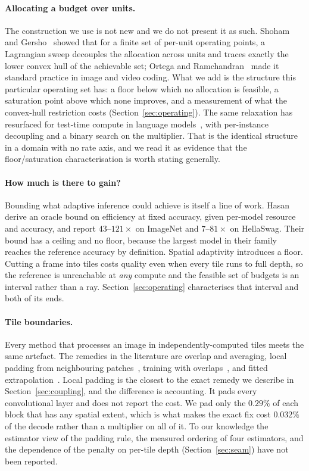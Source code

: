 \documentclass[10pt,twocolumn,letterpaper]{article}
\begin{document}
\paragraph{Allocating a budget over units.} The construction we use is not new
and we do not present it as such. Shoham and Gersho~\cite{shoham1988} showed
that for a finite set of per-unit operating points, a Lagrangian sweep decouples
the allocation across units and traces exactly the lower convex hull of the
achievable set; Ortega and Ramchandran~\cite{ortega1998} made it standard
practice in image and video coding. What we add is the structure this particular
operating set has: a floor below which no allocation is feasible, a saturation
point above which none improves, and a measurement of what the convex-hull
restriction costs (Section~\ref{sec:operating}). The same relaxation has
resurfaced for test-time compute in language models~\cite{ctca}, with per-instance
decoupling and a binary search on the multiplier. That is the identical structure
in a domain with no rate axis, and we read it as evidence that the
floor/saturation characterisation is worth stating generally.

\paragraph{How much is there to gain?} Bounding what adaptive inference could
achieve is itself a line of work. Hasan~\etal~\cite{adaptivelimits} derive an
oracle bound on efficiency at fixed accuracy, given per-model resource and
accuracy, and report $43$--$121\times$ on ImageNet and $7$--$81\times$ on
HellaSwag. Their bound has a ceiling and no floor, because the largest model in
their family reaches the reference accuracy by definition. Spatial adaptivity
introduces a floor. Cutting a frame into tiles costs quality even when every tile
runs to full depth, so the reference is unreachable at \emph{any} compute and
the feasible set of budgets is an interval rather than a ray.
Section~\ref{sec:operating} characterises that interval and both of its ends.

\paragraph{Tile boundaries.} Every method that processes an image in
independently-computed tiles meets the same artefact. The remedies in the
literature are overlap and averaging, local padding from neighbouring
patches~\cite{localpadding}, training with overlaps~\cite{overlaptrain}, and
fitted extrapolation~\cite{arls}. Local padding is the closest to the exact
remedy we describe in Section~\ref{sec:coupling}, and the difference is
accounting. It pads every convolutional layer and does not report the cost. We
pad only the $0.29\%$ of each block that has any spatial extent, which is what
makes the exact fix cost $0.032\%$ of the decode rather than a multiplier on all
of it. To our knowledge the estimator view of the padding rule, the measured
ordering of four estimators, and the dependence of the penalty on per-tile depth
(Section~\ref{sec:seam}) have not been reported.
\end{document}
